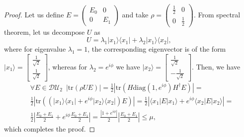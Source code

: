\documentclass[preprint,12pt, a4paper]{elsarticle}
\newcommand{\ket}[1]{\ensuremath{|#1\rangle}}
\newcommand{\bra}[1]{\ensuremath{\langle#1|}}
\newcommand{\ketbra}[2]{\ensuremath{\ket{#1}\bra{#2}}}
\newcommand{\proj}[1]{\ensuremath{\ketbra{#1}{#1}}}
\newcommand{\1}{{\rm 1\hspace{-0.9mm}l}}
\newcommand{\diaguni}{\ensuremath{\mathcal{DU}}}
\newcommand{\diag}{\mathrm{diag}}
\newcommand{\tr}{\mathrm{tr}}
\begin{document}
\begin{proof}
	
	Let us define $E = \left(\begin{array}{cc}E_0&0\\0&E_1\end{array}\right)  $ 
	and take $\rho = 
	\left(\begin{array}{cc}\frac{1}{2}&0\\0&\frac{1}{2}\end{array}\right) $. 
	From spectral theorem, let us decompose $U$ as
	\begin{equation}
	U= \lambda_1 \ketbra{x_1}{x_1} + \lambda_2 \ketbra{x_1}{x_2}, 
	\end{equation}
	where  for eigenvalue $\lambda_1 = 1$, the corresponding 
	eigenvector is 
	of the form $\ket{x_1} = \left[\begin{array}{c}\frac{1}{\sqrt{2}}\\\frac{1}{\sqrt{2}}\end{array}\right]
	$,
	whereas for  $\lambda_2 = e^{i \phi}$ we have $\ket{x_2} = \left[\begin{array}{c}\frac{1}{\sqrt{2}}\\-\frac{1}{\sqrt{2}}\end{array}\right] 
	$.
	Then, we have 
	\begin{equation}
	\begin{split}
	& \forall E \in \diaguni_2 \,\,\, | \tr (\rho U E) | = \frac{1}{2}  \left| \tr \left(
	H \diag(1, e^{i\phi}) H^\dagger E \right) \right| =  \\ &
	\frac{1}{2} \left| \tr\left((   \proj{x_1} +e^{i \phi}\proj{x_2} ) E \right) 
	\right|  = 
	\frac{1}{2} \left|  \bra{x_1} E \ket{x_1} +  e^{i \phi}\bra{x_2} E \ket{x_2} 
	\right| = \\& 
	\frac{1}{2} \left| \frac{E_0 + E_1}{2} + e^{i \phi } \frac{E_0+E_1}{2} \right| 
	= 
	\frac{\left| 1+ e^{i \phi } \right|}{2} \left| \frac{E_0 + E_1}{2} \right| \le 
	\mu, 
	\end{split}
	\end{equation}
	which completes the proof.
\end{proof}
\end{document}
